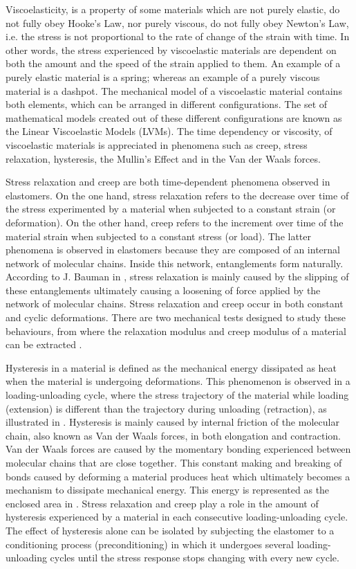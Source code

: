 Viscoelasticity, is a property of some materials which are not purely elastic, do not fully obey Hooke's Law, nor purely viscous, do not fully obey Newton's Law, i.e. the stress is not proportional to the rate of change of the strain with time. In other words, the stress experienced by viscoelastic materials are dependent on both the amount and the speed of the strain applied to them. An example of a purely elastic material is a spring; whereas an example of a purely viscous material is a dashpot. The mechanical model of a viscoelastic material contains both elements, which can be arranged in different configurations. The set of mathematical models created out of these different configurations are known as the Linear Viscoelastic Models (LVMs). The time dependency or viscosity, of viscoelastic materials is appreciated in phenomena such as creep, stress relaxation, hysteresis, the Mullin's Effect and in the Van der Waals forces.

Stress relaxation and creep are both time-dependent phenomena observed in elastomers. On the one hand, stress relaxation refers to the decrease over time of the stress experimented by a material when subjected to a constant strain (or deformation). On the other hand, creep refers to the increment over time of the material strain when subjected to a constant stress (or load). The latter phenomena is observed in elastomers because they are composed of an internal network of molecular chains. Inside this network, entanglements form naturally. According to J. Bauman in \cite{Bauman2008}, stress relaxation is mainly caused by the slipping of these entanglements ultimately causing a loosening of force applied by the network of molecular chains. Stress relaxation and creep occur in both constant and cyclic deformations. There are two mechanical tests designed to study these behaviours, from where the relaxation modulus and creep modulus of a material can be extracted \cite{oberg2016}. 

Hysteresis in a material is defined as the mechanical energy dissipated as heat when the material is undergoing deformations. This phenomenon is observed in a loading-unloading cycle, where the stress trajectory of the material while loading (extension) is different than the trajectory during unloading (retraction), as illustrated in . Hysteresis is mainly caused by internal friction of the molecular chain, also known as Van der Waals forces, in both elongation and contraction. Van der Waals forces are caused by the momentary bonding experienced between molecular chains that are close together. This constant making and breaking of bonds caused by deforming a material produces heat which ultimately becomes a mechanism to dissipate mechanical energy. This energy is represented as the enclosed area in . Stress relaxation and creep play a role in the amount of hysteresis experienced by a material in each consecutive loading-unloading cycle. The effect of hysteresis alone can be isolated by subjecting the elastomer to a conditioning process (preconditioning) in which it undergoes several loading-unloading cycles until the stress response stops changing with every new cycle.

